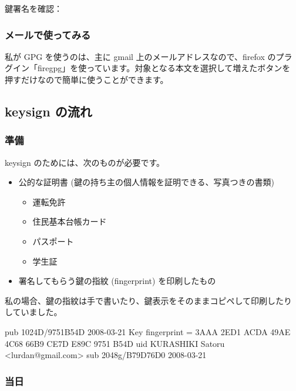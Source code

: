 \documentclass[mingoth,a4paper]{jsarticle}
\begin{document}
鍵署名を確認：

\subsubsection{メールで使ってみる}

私が GPG を使うのは、主に gmail 上のメールアドレスなので、firefox のプラ
グイン「firegpg」を使っています。対象となる本文を選択して増えたボタンを
押すだけなので簡単に使うことができます。

\subsection{keysign の流れ}

\subsubsection{準備}

keysign のためには、次のものが必要です。

\begin{itemize}
 \item 公的な証明書 (鍵の持ち主の個人情報を証明できる、写真つきの書類)
       \begin{itemize}
        \item 運転免許
        \item 住民基本台帳カード
        \item パスポート
        \item 学生証
       \end{itemize}
 \item 署名してもらう鍵の指紋 (fingerprint) を印刷したもの
\end{itemize}

私の場合、鍵の指紋は手で書いたり、鍵表示をそのままコピペして印刷したり
していました。

\begin{commandline}
pub   1024D/9751B54D 2008-03-21
      Key fingerprint = 3AAA 2ED1 ACDA 49AE 4C68  66B9 CE7D E89C 9751 B54D
uid                  KURASHIKI Satoru <lurdan@gmail.com>
sub   2048g/B79D76D0 2008-03-21
\end{commandline}

\subsubsection{当日}
\end{document}
